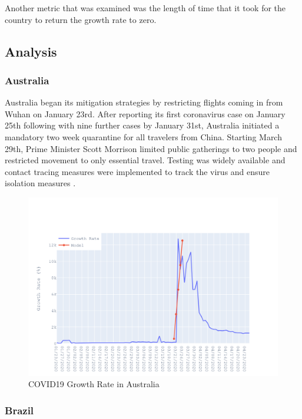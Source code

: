 \documentclass{homework}
\begin{document}
Another metric that was examined was the length of time that it took for the country to return the growth rate to zero.

\newpage
\subsection{Analysis}

\subsubsection{Australia}

Australia began its mitigation strategies by restricting flights coming in from Wuhan on January 23rd. After reporting its first coronavirus case on January 25th following with nine further cases by January 31st, Australia initiated a mandatory two week quarantine for all travelers from China. Starting March 29th, Prime Minister Scott Morrison limited public gatherings to two people and restricted movement to only essential travel. Testing was widely available and contact tracing measures were implemented to track the virus and ensure isolation measures \cite{perper_2020}.

\begin{figure}[H]
  \centering
  \includegraphics[scale=0.3]{task3/Australia.png}
  \caption{COVID19 Growth Rate in Australia}
\end{figure}

\newpage
\subsubsection{Brazil}
\end{document}

